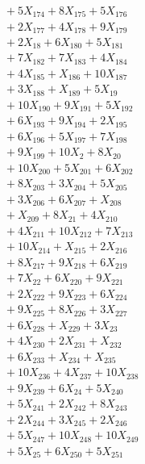 \documentclass[a4paper,10pt]{article}
\begin{document}
{\begin{align}
&\quad  + 5X_{174} + 8X_{175} + 5X_{176} \\[0.5ex]
&\quad  + 2X_{177} + 4X_{178} + 9X_{179} \\[0.5ex]
&\quad  + 2X_{18} + 6X_{180} + 5X_{181} \\[0.5ex]
&\quad  + 7X_{182} + 7X_{183} + 4X_{184} \\[0.5ex]
&\quad  + 4X_{185} + X_{186} + 10X_{187} \\[0.5ex]
&\quad  + 3X_{188} + X_{189} + 5X_{19} \\[0.5ex]
&\quad  + 10X_{190} + 9X_{191} + 5X_{192} \\[0.5ex]
&\quad  + 6X_{193} + 9X_{194} + 2X_{195} \\[0.5ex]
&\quad  + 6X_{196} + 5X_{197} + 7X_{198} \\[0.5ex]
&\quad  + 9X_{199} + 10X_{2} + 8X_{20} \\[0.5ex]
&\quad  + 10X_{200} + 5X_{201} + 6X_{202} \\[0.5ex]
&\quad  + 8X_{203} + 3X_{204} + 5X_{205} \\[0.5ex]
&\quad  + 3X_{206} + 6X_{207} + X_{208} \\[0.5ex]
&\quad  + X_{209} + 8X_{21} + 4X_{210} \\[0.5ex]
&\quad  + 4X_{211} + 10X_{212} + 7X_{213} \\[0.5ex]
&\quad  + 10X_{214} + X_{215} + 2X_{216} \\[0.5ex]
&\quad  + 8X_{217} + 9X_{218} + 6X_{219} \\[0.5ex]
&\quad  + 7X_{22} + 6X_{220} + 9X_{221} \\[0.5ex]
&\quad  + 2X_{222} + 9X_{223} + 6X_{224} \\[0.5ex]
&\quad  + 9X_{225} + 8X_{226} + 3X_{227} \\[0.5ex]
&\quad  + 6X_{228} + X_{229} + 3X_{23} \\[0.5ex]
&\quad  + 4X_{230} + 2X_{231} + X_{232} \\[0.5ex]
&\quad  + 6X_{233} + X_{234} + X_{235} \\[0.5ex]
&\quad  + 10X_{236} + 4X_{237} + 10X_{238} \\[0.5ex]
&\quad  + 9X_{239} + 6X_{24} + 5X_{240} \\[0.5ex]
&\quad  + 5X_{241} + 2X_{242} + 8X_{243} \\[0.5ex]
&\quad  + 2X_{244} + 3X_{245} + 2X_{246} \\[0.5ex]
&\quad  + 5X_{247} + 10X_{248} + 10X_{249} \\[0.5ex]
&\quad  + 5X_{25} + 6X_{250} + 5X_{251} \\[0.5ex]

\end{align}}
\end{document}
